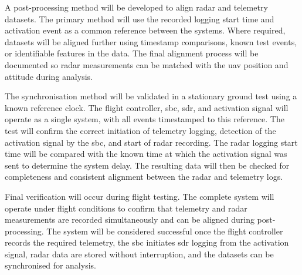 A post-processing method will be developed to align radar and telemetry datasets. The primary method will use the recorded logging start time and activation event as a common reference between the systems. Where required, datasets will be aligned further using timestamp comparisons, known test events, or identifiable features in the data. The final alignment process will be documented so radar measurements can be matched with the \gls{uav} position and attitude during analysis.

The synchronisation method will be validated in a stationary ground test using a known reference clock. The flight controller, \gls{sbc}, \gls{sdr}, and activation signal will operate as a single system, with all events timestamped to this reference. The test will confirm the correct initiation of telemetry logging, detection of the activation signal by the \gls{sbc}, and start of radar recording. The radar logging start time will be compared with the known time at which the activation signal was sent to determine the system delay. The resulting data will then be checked for completeness and consistent alignment between the radar and telemetry logs.

Final verification will occur during flight testing. The complete system will operate under flight conditions to confirm that telemetry and radar measurements are recorded simultaneously and can be aligned during post-processing. The system will be considered successful once the flight controller records the required telemetry, the \gls{sbc} initiates \gls{sdr} logging from the activation signal, radar data are stored without interruption, and the datasets can be synchronised for analysis.